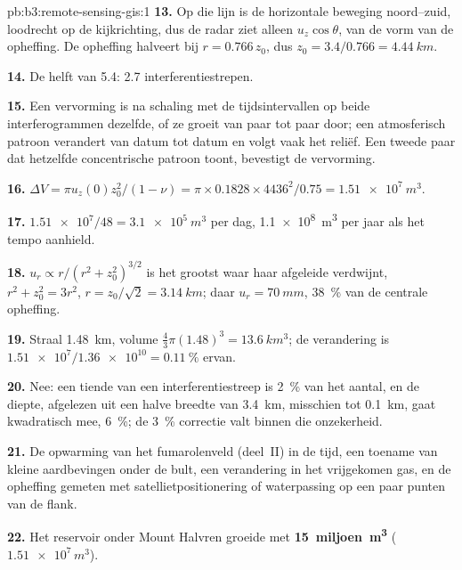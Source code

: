 \begin{solution}{pb:b3:remote-sensing-gis:1}
\textbf{13.} Op die lijn is de horizontale beweging noord--zuid,
loodrecht op de kijkrichting, dus de radar ziet alleen $u_z\cos\theta$, van de
vorm van de opheffing. De opheffing halveert bij $r = 0.766\,z_0$, dus $z_0 =
3.4/0.766 = \qty{4.44}{km}$.

\textbf{14.} De helft van 5.4: 2.7 interferentiestrepen.

\textbf{15.} Een vervorming is na schaling met de tijdsintervallen op beide interferogrammen dezelfde,
of ze groeit van paar tot paar door; een
atmosferisch patroon verandert van datum tot datum en volgt vaak het
reliëf. Een tweede paar dat hetzelfde concentrische patroon toont, bevestigt de
vervorming.

\textbf{16.} $\Delta V = \pi u_z(0)z_0^2/(1 - \nu) = \pi\times0.1828\times
4436^2/0.75 = \qty{1.51e7}{m^3}$.

\textbf{17.} $\num{1.51e7}/48 = \qty{3.1e5}{m^3}$ per dag, \qty{1.1e8}{m^3}
per jaar als het tempo aanhield.

\textbf{18.} $u_r \propto r/(r^2 + z_0^2)^{3/2}$ is het grootst waar haar afgeleide
verdwijnt, $r^2 + z_0^2 = 3r^2$, $r = z_0/\sqrt2 = \qty{3.14}{km}$;
daar $u_r = \qty{70}{mm}$, \qty{38}{\percent} van de centrale opheffing.

\textbf{19.} Straal \qty{1.48}{km}, volume $\frac43\pi(1.48)^3 =
\qty{13.6}{km^3}$; de verandering is $\num{1.51e7}/\num{1.36e10} =
\qty{0.11}{\percent}$ ervan.

\textbf{20.} Nee: een tiende van een interferentiestreep is \qty{2}{\percent} van het aantal, en
de diepte, afgelezen uit een halve breedte van \qty{3.4}{km}, misschien tot
\qty{0.1}{km}, gaat kwadratisch mee, \qty{6}{\percent}; de \qty{3}{\percent}
correctie valt binnen die onzekerheid.

\textbf{21.} De opwarming van het fumarolenveld (deel~II) in de tijd, een
toename van kleine aardbevingen onder de bult, een verandering in het vrijgekomen
gas, en de opheffing gemeten met satellietpositionering of waterpassing op een
paar punten van de flank.

\textbf{22.} Het reservoir onder Mount Halvren groeide met
\textbf{15~miljoen~\unit[text-series-to-math=true]{m^3}} ($\num{1.51e7}\,\unit{m^3}$).
\end{solution}
